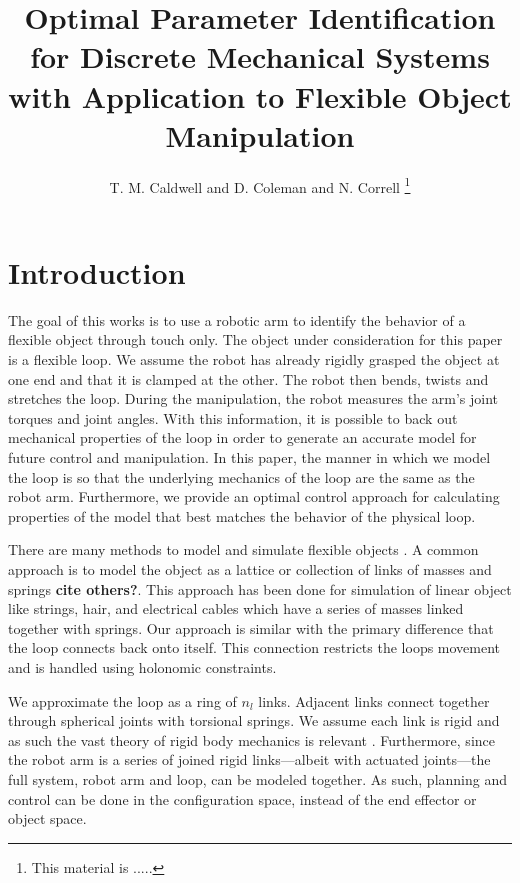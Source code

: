 \documentclass[letterpaper, 10pt, conference]{ieeeconf}
\title{Optimal Parameter Identification for Discrete Mechanical Systems with Application to Flexible Object Manipulation}
\author{T. M. Caldwell and  D. Coleman and N. Correll%
\thanks{
This material is .....}%
}
\begin{document}
\maketitle

\begin{abstract}




\end{abstract}

\section{Introduction}
The goal of this works is to use a robotic arm to identify the behavior of a flexible object through touch only.  The object under consideration for this paper is a flexible loop.  We assume the robot has already rigidly grasped the object at one end and that it is clamped at the other.  The robot then bends, twists and stretches the loop.  During the manipulation, the robot measures the arm's joint torques and joint angles.  With this information, it is possible to back out mechanical properties of the loop in order to generate an accurate model for future control and manipulation.  In this paper, the manner in which we model the loop is so that the underlying mechanics of the loop are the same as the robot arm.  Furthermore, we provide an optimal control approach for calculating properties of the model that best matches the behavior of the physical loop.

There are many methods to model and simulate flexible objects \cite{khalil_payeur}.  A common approach is to model the object as a lattice or collection of links of masses and springs \cite{sahari_etal, wakamatsu_etal}\textbf{cite others?}.  This approach has been done for simulation of linear object like strings, hair, and electrical cables which have a series of masses linked together with springs.   Our approach is similar with the primary difference that the loop connects back onto itself.  This connection restricts the loops movement and is handled using holonomic constraints.  

We approximate the loop as a ring of $n_l$ links.  Adjacent links connect together through spherical joints with torsional springs. We assume each link is rigid and as such the vast theory of rigid body mechanics is relevant \cite{murray_li_sastry}.  Furthermore, since the robot arm is a series of joined rigid links---albeit with actuated joints---the full system, robot arm and loop, can be modeled together.  As such, planning and control can be done in the configuration space, instead of the end effector or object space. 
\end{document}
